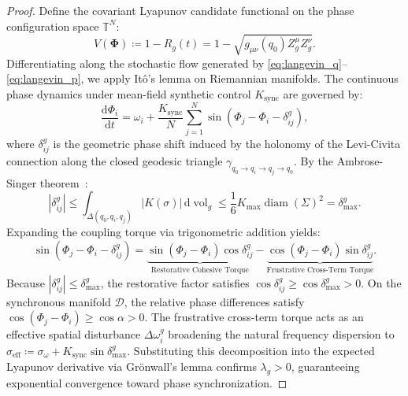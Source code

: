 \documentclass[11pt,a4paper,reqno]{article}
\theoremstyle{plain}
\theoremstyle{definition}
\theoremstyle{remark}
\numberwithin{equation}{section}
\begin{document}
\begin{proof}
Define the covariant Lyapunov candidate functional on the phase configuration space $\mathbb{T}^N$:
\begin{equation}
V(\bm{\Phi}) \coloneqq 1 - R_g(t) = 1 - \sqrt{g_{\mu\nu}(q_0) Z_g^\mu Z_g^\nu}.
\end{equation}
Differentiating along the stochastic flow generated by \eqref{eq:langevin_q}--\eqref{eq:langevin_p}, we apply It\^o's lemma on Riemannian manifolds. The continuous phase dynamics under mean-field synthetic control $K_{\mathrm{sync}}$ are governed by:
\begin{equation}
\frac{\mathrm{d}\Phi_i}{\mathrm{d}t} = \omega_i + \frac{K_{\mathrm{sync}}}{N} \sum_{j=1}^N \sin\left(\Phi_j - \Phi_i - \delta_{ij}^g\right),
\end{equation}
where $\delta_{ij}^g$ is the geometric phase shift induced by the holonomy of the Levi-Civita connection along the closed geodesic triangle $\gamma_{q_0 \to q_i \to q_j \to q_0}$. By the Ambrose-Singer theorem~\cite{AmbroseSinger1953}:
\begin{equation}
|\delta_{ij}^g| \le \int_{\Delta(q_0, q_i, q_j)} |K(\sigma)| \, \mathrm{d}\operatorname{vol}_g \le \frac{1}{6} K_{\max} \operatorname{diam}(\Sigma)^2 = \delta_{\max}^g.
\end{equation}
Expanding the coupling torque via trigonometric addition yields:
\begin{equation}
\sin(\Phi_j - \Phi_i - \delta_{ij}^g) = \underbrace{\sin(\Phi_j - \Phi_i) \cos \delta_{ij}^g}_{\text{Restorative Cohesive Torque}} - \underbrace{\cos(\Phi_j - \Phi_i) \sin \delta_{ij}^g}_{\text{Frustrative Cross-Term Torque}}.
\label{eq:trig_expansion}
\end{equation}
Because $|\delta_{ij}^g| \le \delta_{\max}^g$, the restorative factor satisfies $\cos \delta_{ij}^g \ge \cos \delta_{\max}^g > 0$. On the synchronous manifold $\mathcal{D}$, the relative phase differences satisfy $\cos(\Phi_j - \Phi_i) \ge \cos \alpha > 0$. The frustrative cross-term torque acts as an effective spatial disturbance $\Delta \omega_i^g$ broadening the natural frequency dispersion to $\sigma_{\mathrm{eff}} \coloneqq \sigma_\omega + K_{\mathrm{sync}} \sin \delta_{\max}^g$. 
Substituting this decomposition into the expected Lyapunov derivative via Gr\"onwall's lemma confirms $\lambda_g > 0$, guaranteeing exponential convergence toward phase synchronization.
\end{proof}

\bigskip
\end{document}

